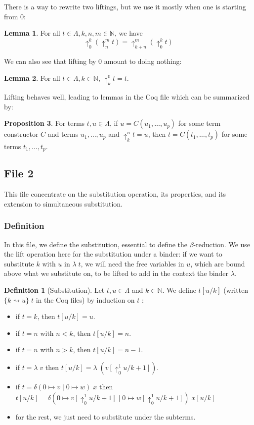 \documentclass{article}
\newcommand{\bN}[0]{\mathbb N}
\newcommand{\lift}[2]{\uparrow_{#1}^{#2}}
\newcommand{\deltacase}[3]{\delta(0\mapsto #1\mid 0 \mapsto #2)\;#3}
\theoremstyle{definition}
\newtheorem{defi}{Definition}
\newtheorem{prop}{Proposition}[subsection]
\newtheorem{lem}[prop]{Lemma}
\begin{document}
There is a way to rewrite two liftings, but we use it mostly when one is starting from 0:
\begin{lem}
    For all $t\in \Lambda, k,n,m\in\bN$, we have
    $$\lift 0 k (\lift n m t) = \lift {k + n} m (\lift 0 k t)$$
\end{lem}

We can also see that lifting by $0$ amount to doing nothing:
\begin{lem}
    For all $t\in \Lambda,k\in\bN$, $\lift k 0 t = t$.
\end{lem}

Lifting behaves well, leading to lemmas in the Coq file which can be summarized by:
\begin{prop}
    For terms $t,u\in\Lambda$, if $u = C(u_1,\ldots,u_p)$ for some term constructor $C$ and terms
    $u_1,\ldots,u_p$ and $\lift k n t = u$, then $t = C(t_1,\ldots,t_p)$ for some terms $t_1,\ldots,t_p$.
\end{prop}

\subsection{File 2}

This file concentrate on the substitution operation, its properties, and its extension to simultaneous
substitution.

\subsubsection{Definition}

In this file, we define the substitution, essential to define the $\beta$-reduction. We use the lift operation
here for the substitution under a binder: if we want to substitute $k$ with $u$ in $\lambda\;t$, we will need
the free variables in $u$, which are bound above what we substitute on, to be lifted to add in the context
the binder $\lambda$.

\begin{defi}[Substitution]
    Let $t,u\in\Lambda$ and $k\in \bN$. We define $t[u/k]$ (written $\{k \rightsquigarrow u\}\;t$ in the Coq 
    files) by induction on $t$ :
    \begin{itemize}
        \item if $t = k$, then $t[u/k] = u$.
        \item if $t = n$ with $n < k$, then $t[u/k] = n$.
        \item if $t = n$ with $n > k$, then $t[u/k] = n - 1$.
        \item if $t = \lambda\;v$ then $t[u/k] = \lambda\;(v[\lift 0 1 u/k+1])$.
        \item if $t = \deltacase{v}{w}{x}$ then
        $t[u/k] = \deltacase{v[\lift 0 1 u/k + 1]}{w[\lift 0 1 u/k + 1]}{x[u/k]}$
        \item for the rest, we just need to substitute under the subterms.
    \end{itemize}
\end{defi}
\end{document}
